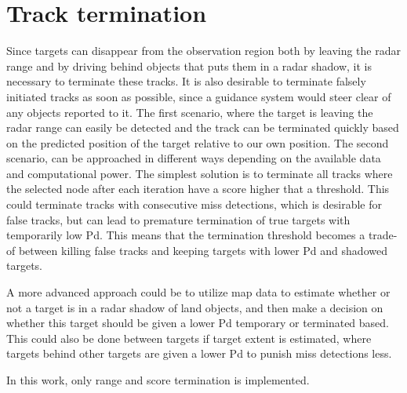 \section{Track termination}
Since targets can disappear from the observation region both by leaving the radar range and by driving behind objects that puts them in a radar shadow, it is necessary to terminate these tracks. It is also desirable to terminate falsely initiated tracks as soon as possible, since a guidance system would steer clear of any objects reported to it. The first scenario, where the target is leaving the radar range can easily be detected and the track can be terminated quickly based on the predicted position of the target relative to our own position. The second scenario, can be approached in different ways depending on the available data and computational power. The simplest solution is to terminate all tracks where the selected node after each iteration have a score higher that a threshold. This could terminate tracks with consecutive miss detections, which is desirable for false tracks, but can lead to premature termination of true targets with temporarily low \gls{Pd}. This means that the termination threshold becomes a trade-of between killing false tracks and keeping targets with lower \gls{Pd} and shadowed targets. 

A more advanced approach could be to utilize map data to estimate whether or not a target is in a radar shadow of land objects, and then make a decision on whether this target should be given a lower \gls{Pd} temporary or terminated based. This could also be done between targets if target extent is estimated, where targets behind other targets are given a lower \gls{Pd} to punish miss detections less.

In this work, only range and score termination is implemented.

